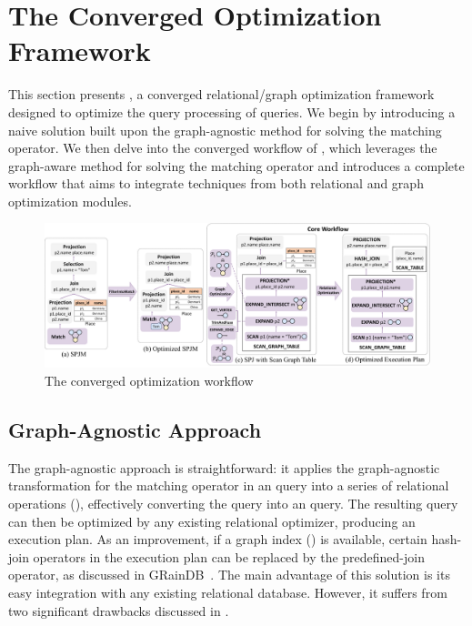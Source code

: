 \section{The Converged Optimization Framework}
\label{sec:optimizations}
This section presents \name, a converged relational/graph optimization framework designed to optimize the query
processing of \spjm queries. We begin by introducing a naive solution built upon the graph-agnostic
method for solving the matching operator. We then delve into the converged workflow of \name, which leverages the graph-aware method for solving the matching operator and introduces a complete workflow that aims to integrate techniques from both relational and graph optimization modules.



\begin{figure}
    \centering
    \includegraphics[width=.9\linewidth]{./figures/workflow.pdf}
    \caption{The converged optimization workflow}
    \label{fig:framework-workflow}
\end{figure}


\vspace*{-3mm}
\subsection{Graph-Agnostic Approach}
\label{sec:relational-only}
The graph-agnostic approach is straightforward: it applies the graph-agnostic transformation for the matching operator in an \spjm query into a series of relational operations (), effectively converting the \spjm query into an \spj query. The resulting \spj query can then be optimized by any existing relational optimizer, producing an execution plan. As an improvement, if a graph index () is available, certain hash-join operators in the execution plan can be replaced by the predefined-join operator, as discussed in GRainDB~\cite{graindb}. The main advantage of this solution is its easy integration with any existing relational database. However, it suffers from two significant drawbacks discussed in .

